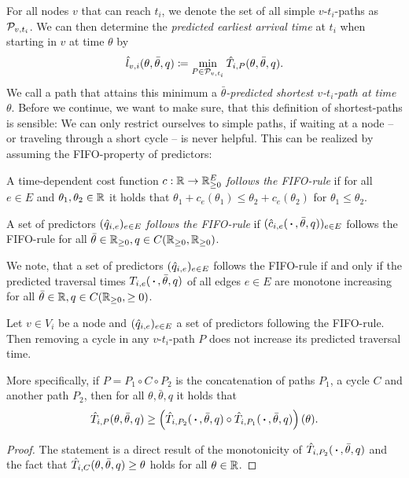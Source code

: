 For all nodes $v$ that can reach $t_i$, we denote the set of all simple $v$-$t_i$-paths as $\mathcal{P}_{v,t_i}$.
We can then determine the \emph{predicted earliest arrival time} at $t_i$ when starting in $v$ at time $\theta$ by
\[
    \hat l_{v,i}(\theta, \bar\theta, q) \coloneqq \min_{P \in \mathcal{P}_{v,t_i}} \hat T_{i, P}(\theta,\bar\theta, q).
\]
We call a path that attains this minimum a \emph{$\bar\theta$-predicted shortest $v$-$t_i$-path at time $\theta$}.
Before we continue, we want to make sure, that this definition of shortest-paths is sensible:
We can only restrict ourselves to simple paths, if waiting at a node -- or traveling through a short cycle -- is never helpful.
This can be realized by assuming the FIFO-property of predictors:
\begin{definition}
    A time-dependent cost function $c: \mathbb{R}\rightarrow \mathbb{R}_{\geq0}^E$ \emph{follows the FIFO-rule} if for all $e\in E$ and $\theta_1,\theta_2\in\mathbb{R}$ it holds that $\theta_1 + c_e(\theta_1) \leq \theta_2 + c_e(\theta_2)$ for $\theta_1\leq \theta_2$.

    A set of predictors $(\hat q_{i,e})_{e\in E}$ \emph{follows the FIFO-rule} if $(\hat c_{i,e}(\,\boldsymbol{\cdot}\,, \bar\theta, q))_{e\in E}$ follows the FIFO-rule for all $\bar\theta\in\mathbb{R}_{\geq0}, q\in{C}{\left({\mathbb{R}_{\geq0}},{\mathbb{R}_{\geq0}}\right)}$.
\end{definition}

We note, that a set of predictors $(\hat q_{i,e})_{e\in E}$ follows the FIFO-rule if and only if the predicted traversal times $T_{i,e}(\,\boldsymbol{\cdot}\,, \bar\theta, q)$ of all edges $e\in E$ are monotone increasing for all $\bar\theta\in\mathbb{R}, q\in{C}{\left({\mathbb{R}_{\geq0}},{\geq0}\right)}$.

\begin{proposition}\label{prop:removing-cycles-in-fifo-graphs}
    Let $v\in V_i$ be a node and  $(\hat q_{i,e})_{e\in E}$  a set of predictors following the FIFO-rule.
    Then removing a cycle in any $v$-$t_i$-path $P$ does not increase its predicted traversal time.

    More specifically, if $P=P_1\circ C \circ P_2$ is the concatenation of paths $P_1$, a cycle $C$ and another path $P_2$, then for all $\theta,\bar\theta,q$ it holds that
    \[
        \hat T_{i,P}(\theta,\bar\theta,q) \geq \left(
        \hat T_{i,P_2}(\,\boldsymbol{\cdot}\,,\bar\theta,q)
        \circ \hat T_{i,P_1}(\,\boldsymbol{\cdot}\,,\bar\theta,q)
    \right)(\theta).
    \]
\end{proposition}
\begin{proof}
The statement is a direct result of the monotonicity of $\hat T_{i,P_2}(\,\boldsymbol{\cdot}\,,\bar\theta,q)$ and the fact that $\hat T_{i,C}(\theta,\bar\theta,q) \geq \theta$ holds for all $\theta\in\mathbb{R}$.\end{proof}


